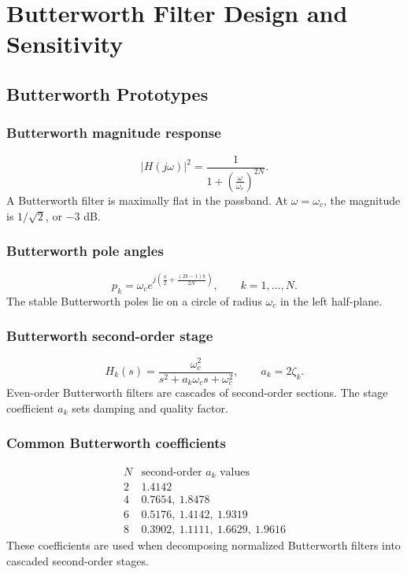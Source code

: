 \section{Butterworth Filter Design and Sensitivity}

\subsection{Butterworth Prototypes}

\subsubsection{Butterworth magnitude response}
\[
|H(j\omega)|^2=\frac{1}{1+\left(\frac{\omega}{\omega_c}\right)^{2N}}.
\]
A Butterworth filter is maximally flat in the passband. At \(\omega=\omega_c\), the magnitude is \(1/\sqrt{2}\), or \(-3\) dB.

\subsubsection{Butterworth pole angles}
\[
p_k=\omega_c e^{j\left(\frac{\pi}{2}+\frac{(2k-1)\pi}{2N}\right)},\qquad k=1,\ldots,N.
\]
The stable Butterworth poles lie on a circle of radius \(\omega_c\) in the left half-plane.

\subsubsection{Butterworth second-order stage}
\[
H_k(s)=\frac{\omega_c^2}{s^2+a_k\omega_c s+\omega_c^2},
\qquad
a_k=2\zeta_k.
\]
Even-order Butterworth filters are cascades of second-order sections. The stage coefficient \(a_k\) sets damping and quality factor.

\subsubsection{Common Butterworth coefficients}
\[
\begin{array}{c|c}
N & \text{second-order }a_k\text{ values}\\ \hline
2 & 1.4142\\
4 & 0.7654,\ 1.8478\\
6 & 0.5176,\ 1.4142,\ 1.9319\\
8 & 0.3902,\ 1.1111,\ 1.6629,\ 1.9616
\end{array}
\]
These coefficients are used when decomposing normalized Butterworth filters into cascaded second-order stages.

